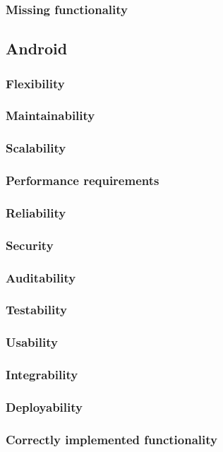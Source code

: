 \documentclass{article}
\begin{document}
        \subsubsection{Missing functionality}
\subsection{Android}
        \subsubsection{Flexibility}
        \subsubsection{Maintainability}
        \subsubsection{Scalability}
        \subsubsection{Performance requirements}
        \subsubsection{Reliability}
        \subsubsection{Security}
        \subsubsection{Auditability}
        \subsubsection{Testability}
        \subsubsection{Usability}
        \subsubsection{Integrability}
        \subsubsection{Deployability}
        \subsubsection{Correctly implemented functionality}
\end{document}
